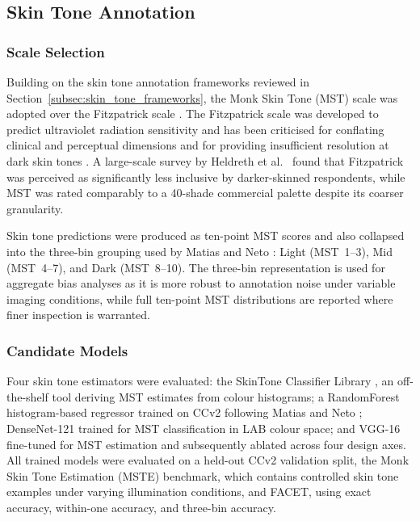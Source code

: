 \subsection{Skin Tone Annotation}
\label{subsec:skintone_annotation}

\subsubsection{Scale Selection}
\label{subsubsec:scale_selection}

Building on the skin tone annotation frameworks reviewed in Section~\ref{subsec:skin_tone_frameworks}, the Monk Skin Tone (MST) scale \cite{Schumann_2024_MonkSkinTone} was adopted over the Fitzpatrick scale \cite{Fitzpatrick_1988_SkinTypes}. The Fitzpatrick scale was developed to predict ultraviolet radiation sensitivity and has been criticised for conflating clinical and perceptual dimensions and for providing insufficient resolution at dark skin tones \cite{Schumann_2024_MonkSkinTone, Groh_2021_Fitzpatrick17k}. A large-scale survey by Heldreth et al.~\cite{Heldreth_2024_WhichSkinToneMeasures} found that Fitzpatrick was perceived as significantly less inclusive by darker-skinned respondents, while MST was rated comparably to a 40-shade commercial palette despite its coarser granularity.

Skin tone predictions were produced as ten-point MST scores and also collapsed into the three-bin grouping used by Matias and Neto \cite{Matias_2024_EnhancingFairnessMST}: Light (MST~1--3), Mid (MST~4--7), and Dark (MST~8--10). The three-bin representation is used for aggregate bias analyses as it is more robust to annotation noise under variable imaging conditions, while full ten-point MST distributions are reported where finer inspection is warranted.

\subsubsection{Candidate Models}
\label{subsubsec:skintone_candidates}

Four skin tone estimators were evaluated: the SkinTone Classifier Library \cite{Pina_2023_SkinToneClassificationLibrary}, an off-the-shelf tool deriving MST estimates from colour histograms; a RandomForest histogram-based regressor trained on CCv2 following Matias and Neto \cite{Matias_2024_EnhancingFairnessMST}; DenseNet-121 \cite{Matias_2024_EnhancingFairnessMST} trained for MST classification in LAB colour space; and VGG-16 \cite{Mbatha_2024_SkinToneLighting} fine-tuned for MST estimation and subsequently ablated across four design axes. All trained models were evaluated on a held-out CCv2 validation split, the Monk Skin Tone Estimation (MSTE) benchmark, which contains controlled skin tone examples under varying illumination conditions, and FACET, using exact accuracy, within-one accuracy, and three-bin accuracy.

